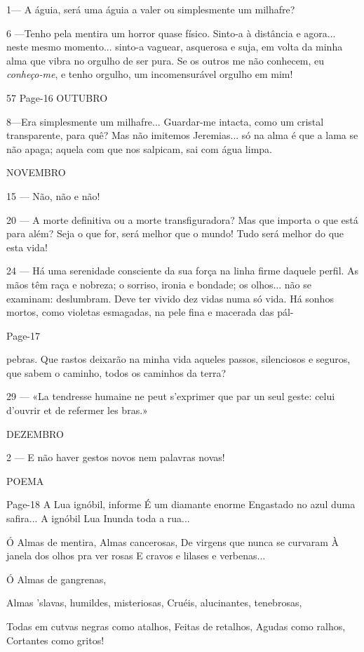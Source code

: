 1— A águia, será uma águia a valer ou simplesmente
um milhafre?

6 —Tenho pela mentira um horror quase físico. 
Sinto-a à distância e agora... neste mesmo momento...
sinto-a vaguear, asquerosa e suja, em volta da minha
alma que vibra no orgulho de ser pura. Se os outros
me não conhecem, eu \textit{conheço-me}, e tenho orgulho,
um incomensurável orgulho em mim!

57
Page-16
OUTUBRO

8—Era simplesmente um milhafre... Guardar-me
intacta, como um cristal transparente, para quê? Mas
não imitemos Jeremias... só na alma é que a lama se
não apaga; aquela com que nos salpicam, sai com água
limpa.

NOVEMBRO

15 — Não, não e não!

20 — A morte definitiva ou a morte transfiguradora?
Mas que importa o que está para além?
Seja o que for, será melhor que o mundo!
Tudo será melhor do que esta vida!

24 — Há uma serenidade consciente da sua força na
linha firme daquele perfil. As mãos têm raça e
nobreza; o sorriso, ironia e bondade; os olhos...
não se examinam: deslumbram. Deve ter vivido dez
vidas numa só vida. Há sonhos mortos, como 
violetas esmagadas, na pele fina e macerada das pál-


Page-17

pebras. Que rastos deixarão na minha vida aqueles
passos, silenciosos e seguros, que sabem o caminho,
todos os caminhos da terra?

29 — «La tendresse humaine ne peut s’exprimer que
par un seul geste: celui d’ouvrir et de refermer les
bras.»

DEZEMBRO

2 — E não haver gestos novos nem palavras novas!


POEMA


Page-18
A Lua ignóbil, informe
É um diamante enorme
Engastado no azul duma safira...
A ignóbil Lua
Inunda toda a rua...

Ó Almas de mentira,
Almas cancerosas,
De virgens que nunca se curvaram
À janela dos olhos pra ver rosas
E cravos e lilases e verbenas...

Ó Almas de gangrenas,

Almas ’slavas, humildes, misteriosas,
Cruéis, alucinantes, tenebrosas,

Todas em cutvas negras como atalhos,
Feitas de retalhos,
Agudas como ralhos,
Cortantes como gritos!

